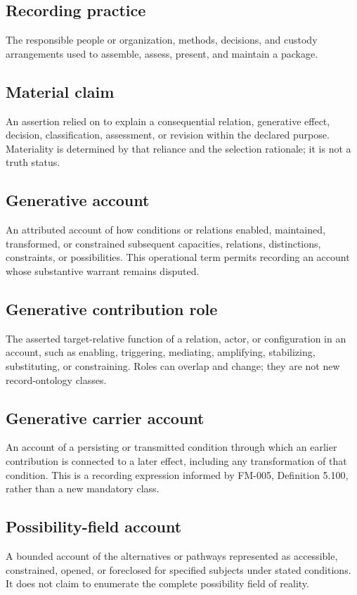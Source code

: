 \documentclass[11pt,a4paper]{article}
\begin{document}
\subsection{Recording practice}
The responsible people or organization, methods, decisions, and custody arrangements used to assemble, assess, present, and maintain a package.

\subsection{Material claim}
An assertion relied on to explain a consequential relation, generative effect, decision, classification, assessment, or revision within the declared purpose. Materiality is determined by that reliance and the selection rationale; it is not a truth status.

\subsection{Generative account}
An attributed account of how conditions or relations enabled, maintained, transformed, or constrained subsequent capacities, relations, distinctions, constraints, or possibilities. This operational term permits recording an account whose substantive warrant remains disputed.

\subsection{Generative contribution role}
The asserted target-relative function of a relation, actor, or configuration in an account, such as enabling, triggering, mediating, amplifying, stabilizing, substituting, or constraining. Roles can overlap and change; they are not new record-ontology classes.

\subsection{Generative carrier account}
An account of a persisting or transmitted condition through which an earlier contribution is connected to a later effect, including any transformation of that condition. This is a recording expression informed by FM-005, Definition 5.100, rather than a new mandatory class.

\subsection{Possibility-field account}
A bounded account of the alternatives or pathways represented as accessible, constrained, opened, or foreclosed for specified subjects under stated conditions. It does not claim to enumerate the complete possibility field of reality.
\end{document}
